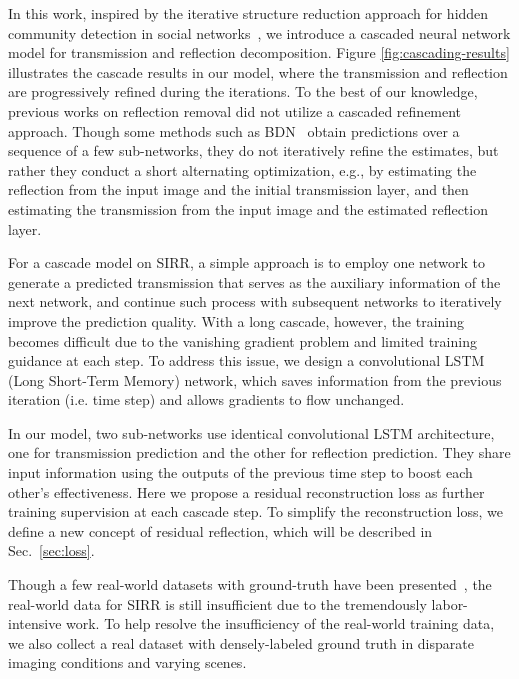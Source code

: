 \documentclass[10pt,twocolumn,letterpaper]{article}
\begin{document}
In this work, inspired by the iterative structure reduction approach for hidden community detection in social networks~\cite{he2018hidden, He15corr}, we introduce a cascaded neural network model for transmission and reflection decomposition. Figure \ref{fig:cascading-results} illustrates the cascade results in our model, where the transmission and reflection are progressively refined during the iterations. 
To the best of our knowledge, previous works on reflection removal did not utilize a cascaded refinement approach. 
Though some methods such as BDN~\cite{yang2018seeing} obtain predictions over a sequence of a few sub-networks, they do not iteratively refine the estimates, but rather they conduct a short alternating optimization, e.g., by estimating the reflection from the input image and the initial transmission layer, and then estimating the transmission from the input image and the estimated reflection layer. 


For a cascade model on SIRR, a simple approach is to employ one network to generate a predicted transmission that serves as the auxiliary information of the next network, and continue such process with subsequent networks to iteratively improve the prediction quality. With a long cascade, however, the training becomes difficult due to the vanishing gradient problem and limited training guidance at each step.
To address this issue, we design a convolutional LSTM (Long Short-Term Memory) network, which saves information from the previous iteration (i.e. time step) and allows gradients to flow unchanged.





In our model, two sub-networks use identical convolutional LSTM architecture, one for transmission prediction and the other for reflection prediction. They share input information using the outputs of the previous time step to boost each other’s effectiveness. Here we propose a residual reconstruction loss as further training supervision at each cascade step. To simplify the reconstruction loss, we define a new concept of residual reflection, which will be described in Sec.~\ref{sec:loss}.   



Though a few real-world datasets with ground-truth have been presented~\cite{wan2017benchmarking, zhang2018single}, the real-world data for SIRR is still insufficient due to the tremendously labor-intensive work.  
To help resolve the insufficiency of the real-world training data, we also collect a real dataset with densely-labeled ground truth in disparate imaging conditions and varying scenes.
\end{document}
